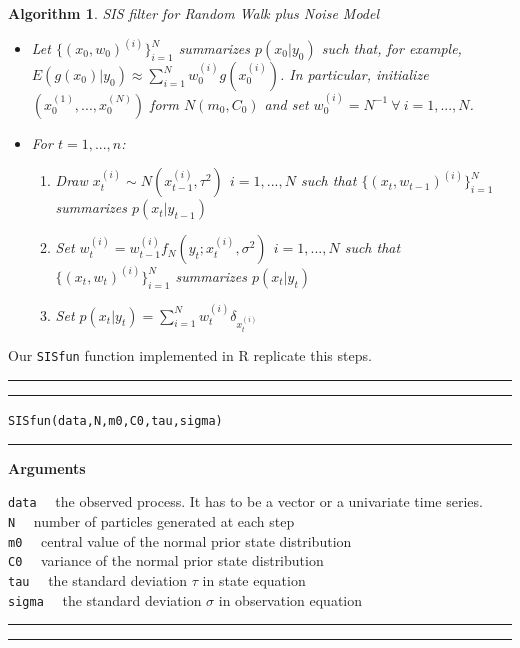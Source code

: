 \documentclass[
]{book}
\theoremstyle{break}
\theoremstyle{nonumberplain}
\newtheorem{algorithm}{Algorithm}[section]
\begin{document}
\begin{algorithm} SIS filter for Random Walk plus Noise Model
\begin{itemize}
\item Let $\{(x_{0},w_{0})^{(i)}\}_{i=1}^{N}$ summarizes $p(x_{0}|y_{0})$ such that, for example, $E(g(x_{0})|y_{0}) \approx \sum_{i=1}^{N}w_{0}^{(i)}g(x_{0}^{(i)})$. In particular, initialize $(x_{0}^{(1)},...,x_{0}^{(N)})$ form $N(m_{0},C_{0})$ and set $w_{0}^{(i)}=N^{-1} \ \forall \ i=1,...,N$.
\item For $t=1,...,n$:
\begin{enumerate}
\item Draw $x_{t}^{(i)} \sim N(x_{t-1}^{(i)},\tau^2) \ \ i=1,...,N$ such that $\{(x_{t},w_{t-1})^{(i)}\}_{i=1}^{N}$ summarizes $p(x_{t}|y_{t-1})$
\item Set $w_{t}^{(i)} = w_{t-1}^{(i)}f_{N}(y_{t};x_{t}^{(i)},\sigma^2) \ \ i=1,...,N$ such that $\{(x_{t},w_{t})^{(i)}\}_{i=1}^{N}$ summarizes $p(x_{t}|y_{t})$
\item Set $p(x_{t}|y_{t})=\sum_{i=1}^{N}w_{t}^{(i)}\delta_{x_{t}^{(i)}}$
\end{enumerate}
\end{itemize}
\end{algorithm}

Our \texttt{SISfun} function implemented in R replicate this steps.\\

\hrule
\hrule

\hfill\break
\texttt{SISfun(data,N,m0,C0,tau,sigma)}\\

\hrule

\textbf{Arguments}

\texttt{data} ~~the observed process. It has to be a vector or a
univariate time series.\\
\texttt{N} ~~number of particles generated at each step\\
\texttt{m0} ~~central value of the normal prior state distribution\\
\texttt{C0} ~~variance of the normal prior state distribution\\
\texttt{tau} ~~the standard deviation \(\tau\) in state equation\\
\texttt{sigma} ~~the standard deviation \(\sigma\) in observation
equation

\hrule
\hrule
\end{document}
